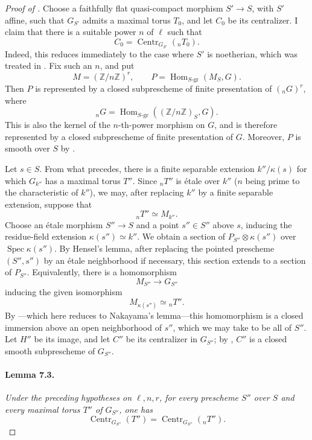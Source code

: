 \begin{proof}[Proof of ]
Choose a faithfully flat quasi-compact morphism \(S'\to S\), with
\(S'\) affine, such that \(G_{S'}\) admits a maximal torus \(T_0\),
and let \(C_0\) be its centralizer. I claim that there is a suitable
power \(n\) of \(\ell\) such that
\[
  C_0=\operatorname{Centr}_{G_{S'}}({}_nT_0).
\]
Indeed, this reduces immediately to the case where \(S'\) is
noetherian, which was treated in . Fix such an \(n\), and put
\[
  M=(\mathbb Z/n\mathbb Z)^r,
  \qquad
  P=\operatorname{Hom}_{S\text{-gr}}(M_S,G).
\]
Then \(P\) is represented by a closed subprescheme of finite
presentation of \(({}_nG)^r\), where
\[
  {}_nG=\operatorname{Hom}_{S\text{-gr}}
    ((\mathbb Z/n\mathbb Z)_S,G).
\]
This is also the kernel of the \(n\)-th-power morphism on \(G\), and
is therefore represented by a closed subprescheme of finite
presentation of \(G\). Moreover, \(P\) is smooth over \(S\) by
.

Let \(s\in S\). From what precedes, there is a finite separable
extension \(k''/\kappa(s)\) for which \(G_{k''}\) has a maximal
torus \(T''\). Since \({}_nT''\) is étale over \(k''\) (\(n\) being
prime to the characteristic of \(k''\)), we may,
after replacing \(k''\) by a finite separable extension, suppose
that
\[
  {}_nT''\simeq M_{k''}.
\]
Choose an étale morphism \(S''\to S\) and a point \(s''\in S''\)
above \(s\), inducing the residue-field extension
\(\kappa(s'')\simeq k''\). We obtain a section of
\(P_{S''}\otimes\kappa(s'')\) over
\(\operatorname{Spec}\kappa(s'')\). By Hensel's lemma, after
replacing the pointed prescheme \((S'',s'')\) by an étale
neighborhood if necessary, this section extends to a section of
\(P_{S''}\). Equivalently, there is a homomorphism
\[
  M_{S''}\longrightarrow G_{S''}
\]
inducing the given isomorphism
\[
  M_{\kappa(s'')}\simeq{}_nT''.
\]
By ---which here reduces to Nakayama's lemma---this
homomorphism is a closed immersion above an
open neighborhood of \(s''\), which we may take to be all of
\(S''\). Let \(H''\) be its image, and let \(C''\) be its
centralizer in \(G_{S''}\); by , \(C''\) is a closed smooth
subprescheme of \(G_{S''}\).

\paragraph{\textbf{Lemma 7.3.}}
\emph{Under the preceding hypotheses on \(\ell,n,r\), for every
prescheme \(S''\) over \(S\) and every maximal torus \(T''\) of
\(G_{S''}\), one has}
\[
  \operatorname{Centr}_{G_{S''}}(T'')
  =
  \operatorname{Centr}_{G_{S''}}({}_nT'').
\]


\end{proof}
